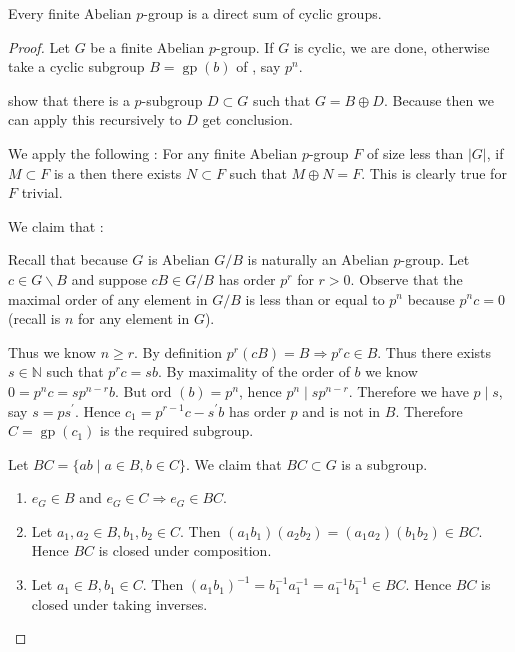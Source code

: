 \documentclass{article}
\newcommand{\gp}{\operatorname{gp}}
\begin{document}


\begin{thma}
Every finite Abelian $p$-group is a direct sum of cyclic groups.
\end{thma}
\begin{proof}
Let $G$ be a finite Abelian $p$-group. If $G$ is cyclic, we are done, otherwise take a cyclic subgroup $B=\gp(b)$ of , say $p^{n}$.

 show that there is a $p$-subgroup $D \subset G$ such that $G=B \oplus D .$ Because then we can apply this recursively to  $D$ get conclusion.

We apply the following : For any finite Abelian $p$-group $F$ of size less than $|G|$, if $M \subset F$ is a  then there exists $N \subset F$ such that $M \oplus N=F$. This is clearly true for $F$ trivial.

We claim that : 

Recall that because $G$ is Abelian $G / B$ is naturally an Abelian $p$-group. Let $c \in G \backslash B$ and suppose $c B \in G / B$ has order $p^{r}$ for $r>0$. Observe that the maximal order of any element in $G / B$ is less than or equal to $p^{n}$ because $p^nc=0$ (recall  is $n$ for any element in $G$).

Thus we know $n \geq r$. By definition $p^{r}(c B)=B \Rightarrow p^{r} c \in B$. Thus there exists $s \in \mathbb{N}$ such that $p^{r} c=s b .$ By maximality of the order of $b$ we know $0=p^{n} c=s p^{n-r} b$. But ord $(b)=p^{n}$, hence $p^{n} \mid s p^{n-r} .$ Therefore we have $p \mid s$, say $s=p s^{\prime} .$ Hence $c_{1}=p^{r-1} c-s^{\prime} b$ has order $p$ and is not in $B$. Therefore $C=\gp\left(c_{1}\right)$ is the required subgroup.


Let $B C=\{a b \mid a \in B, b \in C\} .$ We claim that $B C \subset G$ is a subgroup.
\begin{enumerate}
    \item $e_{G} \in B$ and $e_{G} \in C \Rightarrow e_{G} \in B C$.
    \item Let $a_{1}, a_{2} \in B, b_{1}, b_{2} \in C .$ Then $\left(a_{1} b_{1}\right)\left(a_{2} b_{2}\right)=\left(a_{1} a_{2}\right)\left(b_{1} b_{2}\right) \in B C .$ Hence $B C$ is closed
under composition.
\item Let $a_{1} \in B, b_{1} \in C .$ Then $\left(a_{1} b_{1}\right)^{-1}=b_{1}^{-1} a_{1}^{-1}=a_{1}^{-1} b_{1}^{-1} \in B C .$ Hence $B C$ is closed
under taking inverses.
\end{enumerate}


\end{proof}
\end{document}
